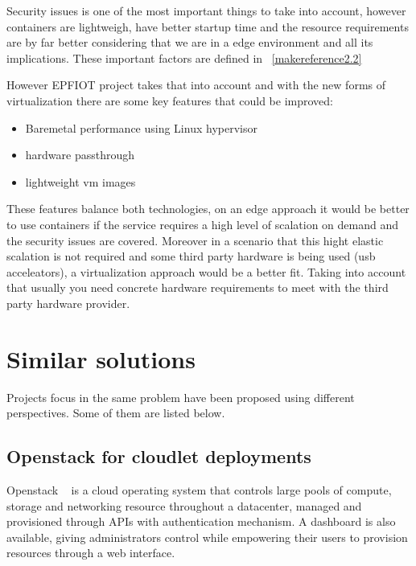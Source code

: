 Security issues is one of the most important things to take into account, however containers are lightweigh, have better startup time and the resource requirements are by far better considering that we are in a edge environment and all its implications. These important factors are defined in ~\ref{makereference2.2}

However EPFIOT project takes that into account and with the new forms of virtualization there are some key features that could be improved:
\begin{itemize}
    \item Baremetal performance using Linux hypervisor
    \item hardware passthrough
    \item lightweight vm images
\end{itemize}

These features balance both technologies, on an edge approach it would be better to use containers if the service requires a high level of scalation on demand and the security issues are covered. Moreover in a scenario that  this hight elastic scalation is not required and some third party hardware is being used (usb acceleators), a virtualization approach would be a better fit. Taking into account that usually you need concrete hardware requirements to meet with the third party hardware provider.

\newpage

\section{Similar solutions}
\label{makereference2.3}

Projects focus in the same problem have been proposed using different perspectives. Some of them are listed below.

\subsection{Openstack for cloudlet deployments}
\label{makereference2.3.1}

Openstack ~\cite{openstack} is a cloud operating system that controls large pools of compute, storage and networking resource throughout a datacenter, managed and provisioned through APIs with authentication mechanism.
A dashboard is also available, giving administrators control while empowering their users to provision resources through a web interface. 


